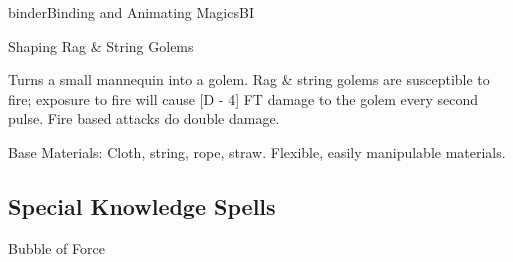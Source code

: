 \begin{college}[1.1]{binder}{Binding and Animating Magics}{BI}
\begin{ritual}[Q-4]{Shaping Rag \& String Golems}

\materialcost{50 sp}
\begin{effects}
Turns a small mannequin into a golem.  Rag \& string golems are
susceptible to fire; exposure to fire will cause [D - 4] FT damage to
the golem every second pulse. Fire based attacks do double damage.

Base Materials: Cloth, string, rope, straw. Flexible, easily
manipulable materials.
\end{effects}
\end{ritual}

\subsection{Special Knowledge Spells}


\begin{spell}[S-1]{Bubble of Force}


\end{spell}
\end{college}
